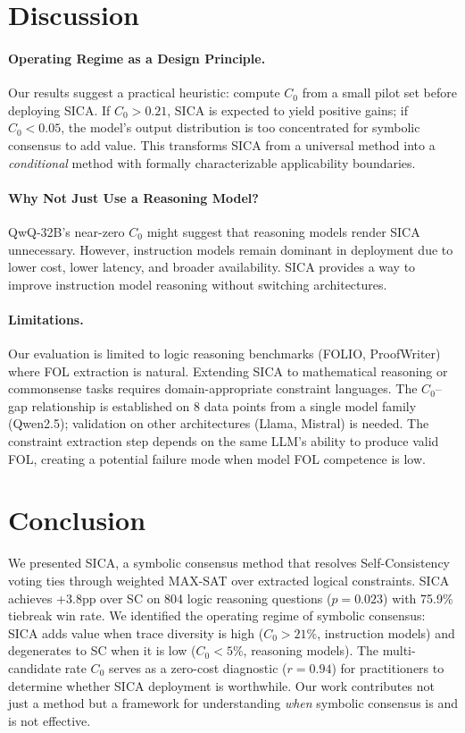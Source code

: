 \documentclass[11pt,a4paper]{article}
\begin{document}
\section{Discussion}
\label{sec:discussion}

\paragraph{Operating Regime as a Design Principle.}
Our results suggest a practical heuristic: compute $C_0$ from a small pilot set before deploying SICA.
If $C_0 > 0.21$, SICA is expected to yield positive gains; if $C_0 < 0.05$, the model's output distribution is too concentrated for symbolic consensus to add value.
This transforms SICA from a universal method into a \emph{conditional} method with formally characterizable applicability boundaries.

\paragraph{Why Not Just Use a Reasoning Model?}
QwQ-32B's near-zero $C_0$ might suggest that reasoning models render SICA unnecessary.
However, instruction models remain dominant in deployment due to lower cost, lower latency, and broader availability.
SICA provides a way to improve instruction model reasoning without switching architectures.

\paragraph{Limitations.}
Our evaluation is limited to logic reasoning benchmarks (FOLIO, ProofWriter) where FOL extraction is natural.
Extending SICA to mathematical reasoning or commonsense tasks requires domain-appropriate constraint languages.
The $C_0$--gap relationship is established on 8 data points from a single model family (Qwen2.5); validation on other architectures (Llama, Mistral) is needed.
The constraint extraction step depends on the same LLM's ability to produce valid FOL, creating a potential failure mode when model FOL competence is low.


\section{Conclusion}
\label{sec:conclusion}

We presented SICA, a symbolic consensus method that resolves Self-Consistency voting ties through weighted MAX-SAT over extracted logical constraints.
SICA achieves +3.8pp over SC on 804 logic reasoning questions ($p = 0.023$) with 75.9\% tiebreak win rate.
We identified the operating regime of symbolic consensus: SICA adds value when trace diversity is high ($C_0 > 21\%$, instruction models) and degenerates to SC when it is low ($C_0 < 5\%$, reasoning models).
The multi-candidate rate $C_0$ serves as a zero-cost diagnostic ($r = 0.94$) for practitioners to determine whether SICA deployment is worthwhile.
Our work contributes not just a method but a framework for understanding \emph{when} symbolic consensus is and is not effective.


\end{document}
